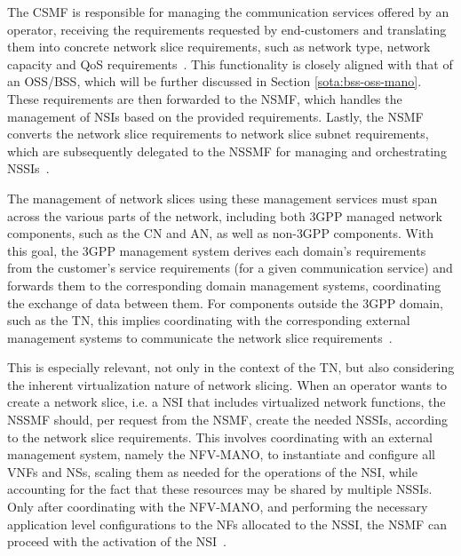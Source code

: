 The \acs{CSMF} is responsible for managing the communication services offered by an operator, receiving the requirements requested by end-customers and translating them into concrete network slice requirements, such as network type, network capacity and \acs{QoS} requirements~\cite{3GPP-28.801}. This functionality is closely aligned with that of an \acs{OSS}/\acs{BSS}, which will be further discussed in Section \ref{sota:bss-oss-mano}. These requirements are then forwarded to the \acs{NSMF}, which handles the management of \acsp{NSI} based on the provided requirements. Lastly, the \acs{NSMF} converts the network slice requirements to network slice subnet requirements, which are subsequently delegated to the \acs{NSSMF} for managing and orchestrating \acsp{NSSI}~\cite{3GPP-28.801}.

The management of network slices using these management services must span across the various parts of the network, including both \acs{3GPP} managed network components, such as the \acs{CN} and \acs{AN}, as well as non-\acs{3GPP} components. With this goal, the \acs{3GPP} management system derives each domain's requirements from the customer's service requirements (for a given communication service) and forwards them to the corresponding domain management systems, coordinating the exchange of data between them. For components outside the \acs{3GPP} domain, such as the \acs{TN}, this implies coordinating with the corresponding external management systems to communicate the network slice requirements~\cite{ETSI_MANAGEMENT_ORCHESTRATION_CONCEPTS}.

This is especially relevant, not only in the context of the \acs{TN}, but also considering the inherent virtualization nature of network slicing. When an operator wants to create a network slice, i.e. a \acs{NSI} that includes virtualized network functions, the \acs{NSSMF} should, per request from the \acs{NSMF}, create the needed \acsp{NSSI}, according to the network slice requirements. This involves coordinating with an external management system, namely the \acs{NFV-MANO}, to instantiate and configure all \acsp{VNF} and \acsp{NS}, scaling them as needed for the operations of the \acs{NSI}, while accounting for the fact that these resources may be shared by multiple \acsp{NSSI}. Only after coordinating with the \acs{NFV-MANO}, and performing the necessary application level configurations to the \acsp{NF} allocated to the \acs{NSSI}, the \acs{NSMF} can proceed with the activation of the \acs{NSI}~\cite{3GPP-28.801}.

